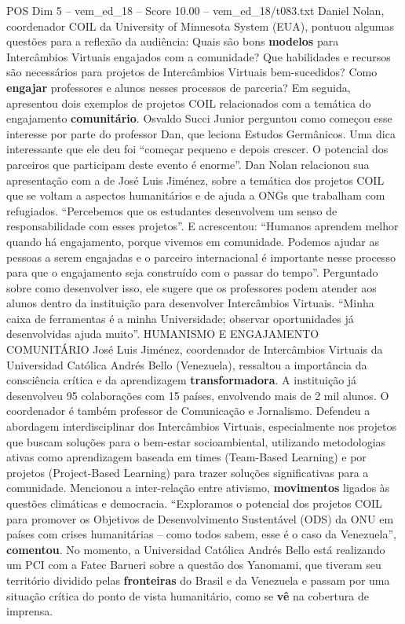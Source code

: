 \begin{textsample}{POS Dim 5 – vem\_ed\_18 – Score 10.00 – vem\_ed\_18/t083.txt}  \label{ex:f5_pos_039}
Daniel Nolan, coordenador COIL da University of Minnesota System (EUA), pontuou algumas questões para a reflexão da audiência: Quais são bons \textbf{modelos} para Intercâmbios Virtuais engajados com a comunidade?
Que habilidades e recursos são necessários para projetos de Intercâmbios Virtuais bem-sucedidos?
Como \textbf{engajar} professores e alunos nesses processos de parceria?
Em seguida, apresentou dois exemplos de projetos COIL relacionados com a temática do engajamento \textbf{comunitário}.
Osvaldo Succi Junior perguntou como começou esse interesse por parte do professor Dan, que leciona Estudos Germânicos.
Uma dica interessante que ele deu foi “começar pequeno e depois crescer.
O potencial dos parceiros que participam deste evento é enorme”.
Dan Nolan relacionou sua apresentação com a de José Luis Jiménez, sobre a temática dos projetos COIL que se voltam a aspectos humanitários e de ajuda a ONGs que trabalham com refugiados. “Percebemos que os estudantes desenvolvem um senso de responsabilidade com esses projetos”.
E acrescentou: “Humanos aprendem melhor quando há engajamento, porque vivemos em comunidade.
Podemos ajudar as pessoas a serem engajadas e o parceiro internacional é importante nesse processo para que o engajamento seja construído com o passar do tempo”.
Perguntado sobre como desenvolver isso, ele sugere que os professores podem atender aos alunos dentro da instituição para desenvolver Intercâmbios Virtuais. “Minha caixa de ferramentas é a minha Universidade; observar oportunidades já desenvolvidas ajuda muito”.
HUMANISMO E ENGAJAMENTO COMUNITÁRIO José Luis Jiménez, coordenador de Intercâmbios Virtuais da Universidad Católica Andrés Bello (Venezuela), ressaltou a importância da consciência crítica e da aprendizagem \textbf{transformadora}.
A instituição já desenvolveu 95 colaborações com 15 países, envolvendo mais de 2 mil alunos.
O coordenador é também professor de Comunicação e Jornalismo.
Defendeu a abordagem interdisciplinar dos Intercâmbios Virtuais, especialmente nos projetos que buscam soluções para o bem-estar socioambiental, utilizando metodologias ativas como aprendizagem baseada em times (Team-Based Learning) e por projetos (Project-Based Learning) para trazer soluções significativas para a comunidade.
Mencionou a inter-relação entre ativismo, \textbf{movimentos} ligados às questões climáticas e democracia. “Exploramos o potencial dos projetos COIL para promover os Objetivos de Desenvolvimento Sustentável (ODS) da ONU em países com crises humanitárias – como todos sabem, esse é o caso da Venezuela”, \textbf{comentou}.
No momento, a Universidad Católica Andrés Bello está realizando um PCI com a Fatec Barueri sobre a questão dos Yanomami, que tiveram seu território dividido pelas \textbf{fronteiras} do Brasil e da Venezuela e passam por uma situação crítica do ponto de vista humanitário, como se \textbf{vê} na cobertura de imprensa.

\end{textsample}
